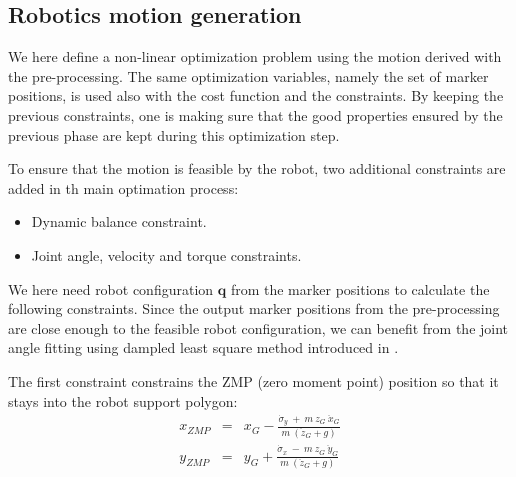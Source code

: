 \documentclass[letterpaper, 10 pt, conference]{ieeeconf}  %
\begin{document}


\subsection{Robotics motion generation}


We here define a non-linear optimization problem using the motion
derived with the pre-processing. 
The same optimization variables, namely the set of marker positions,
is used also with the cost function and the constraints.
By keeping the previous constraints, one is making sure that the good
properties ensured by the previous phase are kept during this
optimization step.

To ensure that the motion is feasible by the robot, two
additional constraints are added in th main optimation process:
\begin{itemize}
\item Dynamic balance constraint.
\item Joint angle, velocity and torque constraints.
\end{itemize}

We here need robot configuration $\mathbf{q}$ from the marker
positions to calculate the following constraints.
Since the output marker positions from the pre-processing are close
enough to the feasible robot configuration, we can benefit from the
joint angle fitting using dampled least square method introduced in
\cite{Nakaoka12Humanoids}. 
 
The first constraint constrains the ZMP (zero moment point) position
so that it stays into the robot support polygon:
\begin{equation}
  \begin{array}{ccc}
    x_{ZMP} &=& x_G - \frac{\dot{\sigma}_y\ +\ m\ z_G\ \ddot{x}_G}{m\ (\ddot{z}_G + g)} \\
    y_{ZMP} &=& y_G + \frac{\dot{\sigma}_x\ -\ m\ z_G\ \ddot{y}_G}{m\ (\ddot{z}_G + g)}
    \end{array}
\label{eq:zmp}
\end{equation}
\end{document}
